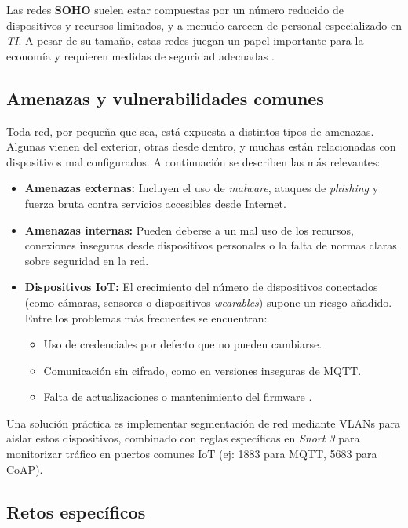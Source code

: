 \documentclass[11pt,a4paper,twoside]{report}
\begin{document}
Las redes \textbf{SOHO} suelen estar compuestas por un número reducido de dispositivos y recursos limitados, y a menudo carecen de personal especializado en \textit{TI}. A pesar de su tamaño, estas redes juegan un papel importante para la economía y requieren medidas de seguridad adecuadas \cite{ruedarevisiting}.

\subsection{Amenazas y vulnerabilidades comunes}

Toda red, por pequeña que sea, está expuesta a distintos tipos de amenazas. Algunas vienen del exterior, otras desde dentro, y muchas están relacionadas con dispositivos mal configurados. A continuación se describen las más relevantes:

\begin{itemize}
	\item \textbf{Amenazas externas:} Incluyen el uso de \textit{malware}, ataques de \textit{phishing} y fuerza bruta contra servicios accesibles desde Internet.
	
	\item \textbf{Amenazas internas:} Pueden deberse a un mal uso de los recursos, conexiones inseguras desde dispositivos personales o la falta de normas claras sobre seguridad en la red.
	
	\item \textbf{Dispositivos IoT:} El crecimiento del número de dispositivos conectados (como cámaras, sensores o dispositivos \textit{wearables}) supone un riesgo añadido. Entre los problemas más frecuentes se encuentran:
	\begin{itemize}
		\item Uso de credenciales por defecto que no pueden cambiarse.
		\item Comunicación sin cifrado, como en versiones inseguras de MQTT.
		\item Falta de actualizaciones o mantenimiento del firmware \cite{bakhshi2024review}.
	\end{itemize}
\end{itemize}



Una solución práctica es implementar segmentación de red mediante VLANs para aislar estos dispositivos, combinado con reglas específicas en \textit{Snort 3} para monitorizar tráfico en puertos comunes IoT (ej: 1883 para MQTT, 5683 para CoAP).

\subsection{Retos específicos}
\end{document}
